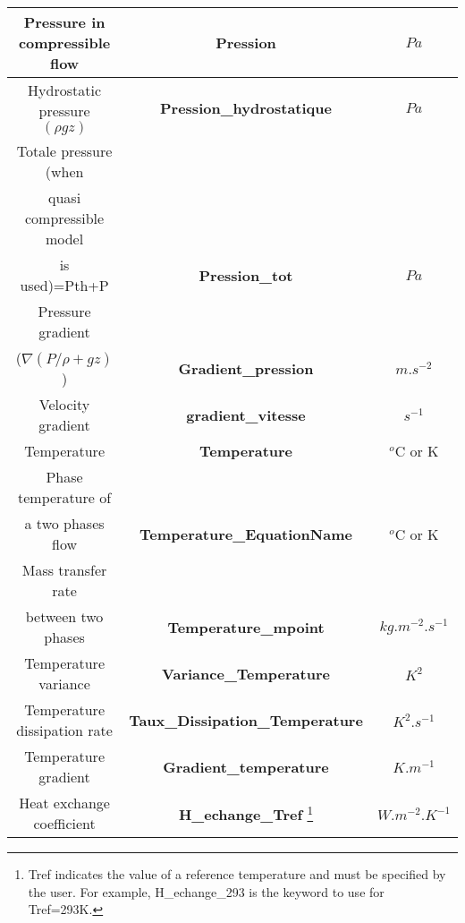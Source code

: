 \begin{longtable}[hcr]{|c|c|c|}
Pressure in compressible flow                   & \textbf{Pression}                         & $Pa$ \\ \hline
Hydrostatic pressure $(\rho g z)$               & \textbf{Pression\_hydrostatique}          & $Pa$ \\ \hline
Totale pressure (when                           &                                           & \\
quasi compressible model                        &                                           & \\
is used)=Pth+P                                  & \textbf{Pression\_tot}                    & $Pa$ \\ \hline
Pressure gradient                               &                                           & \\
($\nabla(P/\rho+gz)$)                           & \textbf{Gradient\_pression}               & $m.s^{-2}$ \\ \hline
Velocity gradient                               & \textbf{gradient\_vitesse}                & $s^{-1}$ \\ \hline
Temperature                                     & \textbf{Temperature}                      & $^o$C or K \\ \hline
Phase temperature of                            &                                           & \\
a two phases flow                               & \textbf{Temperature\_EquationName}        & $^o$C or K \\ \hline
Mass transfer rate                              &                                           & \\
between two phases                              & \textbf{Temperature\_mpoint}              & $kg.m^{-2}.s^{-1}$ \\ \hline
Temperature variance                            & \textbf{Variance\_Temperature}            & $K^2$ \\ \hline
Temperature dissipation rate                    & \textbf{Taux\_Dissipation\_Temperature}   & $K^2.s^{-1}$ \\ \hline
Temperature gradient                            & \textbf{Gradient\_temperature}            & $K.m^{-1}$ \\ \hline
Heat exchange coefficient                       & \textbf{H\_echange\_Tref} \footnote{Tref indicates the value of a reference temperature and must be specified by the user. For example, H\_echange\_293 is the keyword to use for Tref=293K.}            & $W.m^{-2}.K^{-1}$ \\ \hline

\end{longtable}
